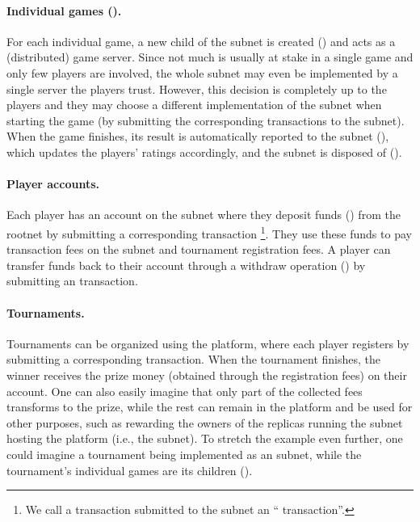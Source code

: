 \paragraph{Individual games ().}
For each individual game, a new child of the  subnet is created () and acts as a (distributed) game server.
Since not much is usually at stake in a single game and only few players are involved,
the whole  subnet may even be implemented by a single server the players trust.
However, this decision is completely up to the players and they may choose a different implementation of the  subnet
when starting the game (by submitting the corresponding transactions to the  subnet).
When the game finishes, its result is automatically reported to the  subnet (), which updates the players' ratings accordingly,
and the  subnet is disposed of ().

\paragraph{Player accounts.}
Each player has an account on the  subnet where they deposit funds () from the rootnet by submitting a corresponding  transaction%
\footnote{We call a transaction submitted to the  subnet an `` transaction''.}.
They use these funds to pay transaction fees on the  subnet and tournament registration fees.
A player can transfer funds back to their  account through a withdraw operation () by submitting an  transaction.

\paragraph{Tournaments.}
Tournaments can be organized using the platform, where each player registers by submitting a corresponding  transaction.
When the tournament finishes, the winner receives the prize money (obtained through the registration fees) on their  account.
One can also easily imagine that only part of the collected fees transforms to the prize, while the rest can remain in the platform
and be used for other purposes, such as rewarding the owners of the replicas running the subnet hosting the platform (i.e., the  subnet).
To stretch the example even further, one could imagine a tournament being implemented as an  subnet, while the tournament's individual games are its children ().

